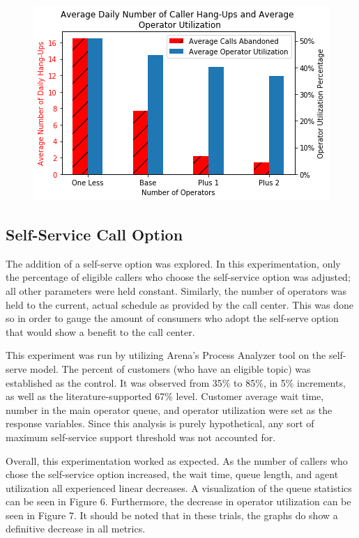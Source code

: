 \documentclass[12pt,twocolumn]{article}
\begin{document}
	\begin{figure}[h]
		\includegraphics[scale=.5]{num_ops_plot.png}
		\caption{}
	\end{figure}
	
	
	\subsection{Self-Service Call Option}

	The addition of a self-serve option was explored.  In this experimentation, only the percentage of eligible callers who choose the self-service option was adjusted; all other parameters were held constant.  Similarly, the number of operators was held to the current, actual schedule as provided by the call center.  This was done so in order to gauge the amount of consumers who adopt the self-serve option that would show a benefit to the call center.
	
	\par
	
	This experiment was run by utilizing Arena's Process Analyzer tool on the self-serve model.  The percent of customers (who have an eligible topic) was established as the control.  It was observed from 35\% to 85\%, in 5\% increments, as well as the literature-supported 67\% level.  Customer average wait time, number in the main operator queue, and operator utilization were set as the response variables.  Since this analysis is purely hypothetical, any sort of maximum self-service support threshold was not accounted for.
	
	\par
	
	Overall, this experimentation worked as expected.  As the number of callers who chose the self-service option increased, the wait time, queue length, and agent utilization all experienced linear decreases.  A visualization of the queue statistics can be seen in Figure 6.  Furthermore, the decrease in operator utilization can be seen in Figure 7.  It should be noted that in these trials, the graphs do show a definitive decrease in all metrics.
	
\end{document}
